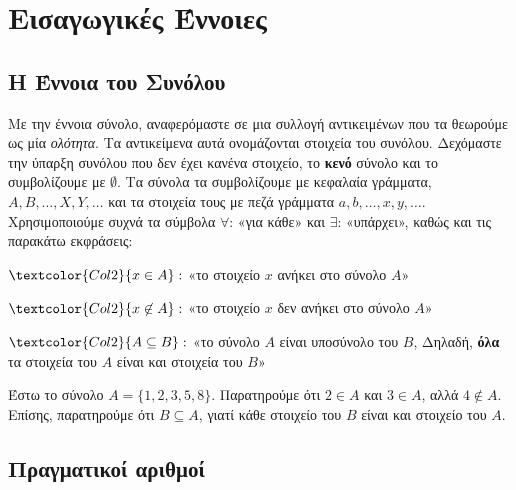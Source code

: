 \chapter*{Εισαγωγικές Έννοιες}


\section*{Η Έννοια του Συνόλου}

Με την έννοια \textcolor{Col1}{σύνολο}, αναφερόμαστε σε μια συλλογή αντικειμένων που τα 
θεωρούμε ως μία \textit{ολότητα}. 
Τα αντικείμενα αυτά ονομάζονται \textcolor{Col1}{στοιχεία} του 
συνόλου. Δεχόμαστε την ύπαρξη συνόλου που δεν έχει κανένα στοιχείο, το \textbf{κενό} 
σύνολο και το συμβολίζουμε με $ \emptyset $. Τα σύνολα τα συμβολίζουμε με κεφαλαία
γράμματα, $ A, B, \ldots, X, Y, \ldots $ και τα στοιχεία τους με πεζά γράμματα $ a,b,
\ldots, x,y, \ldots $. Χρησιμοποιούμε συχνά τα σύμβολα $ \forall $:
«\textcolor{Col1}{για κάθε}» και $ \exists $: «\textcolor{Col1}{υπάρχει}», 
καθώς και τις παρακάτω εκφράσεις:
\begin{center}
  \begin{myitemize}
    \item $ \textcolor{Col2}{x \in A} : $ «το στοιχείο $x$ \textcolor{Col1}{ανήκει} στο 
      σύνολο $A$» \\
    \item $ \textcolor{Col2}{x \not\in A} : $ «το στοιχείο $x$ \textcolor{Col1}{δεν 
      ανήκει} στο σύνολο $A$» \\
    \item $\textcolor{Col2}{A \subseteq B} :$ «το σύνολο $A$ είναι
      \textcolor{Col1}{υποσύνολο} του $B$, Δηλαδή, \textbf{όλα} τα στοιχεία του $A$ είναι
      και στοιχεία του $B$»
  \end{myitemize}
\end{center}

\begin{example}
  Έστω το σύνολο $ A = \{ 1,2,3,5,8 \} $. Παρατηρούμε ότι $ 2 \in A $ και $ 3 \in A $, 
  αλλά $ 4 \not \in A $. Επίσης, παρατηρούμε ότι $ B \subseteq A $, γιατί κάθε στοιχείο 
  του $B$ είναι και στοιχείο του $A$.
\end{example}


\section*{Πραγματικοί αριθμοί} 

\enlargethispage{3\baselineskip}

